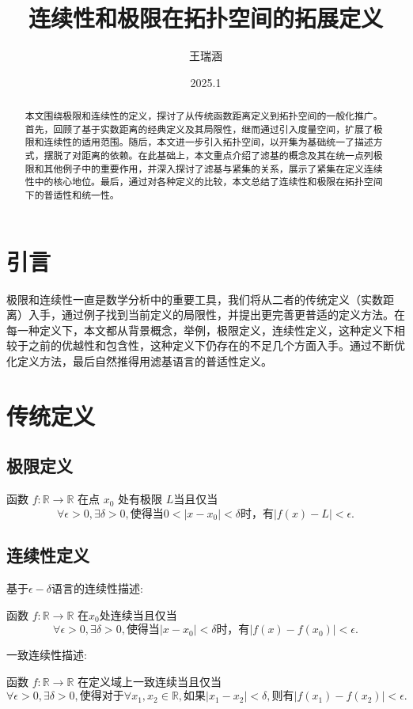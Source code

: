 \documentclass[a4paper, oneside]{article}
\title{\textbf{连续性和极限在拓扑空间的拓展定义}}
\author{王瑞涵}
\date{2025.1}
\begin{document}
\maketitle
\begin{abstract}
    本文围绕极限和连续性的定义，探讨了从传统函数距离定义到拓扑空间的一般化推广。首先，回顾了基于实数距离的经典定义及其局限性，继而通过引入度量空间，扩展了极限和连续性的适用范围。随后，本文进一步引入拓扑空间，以开集为基础统一了描述方式，摆脱了对距离的依赖。在此基础上，本文重点介绍了滤基的概念及其在统一点列极限和其他例子中的重要作用，并深入探讨了滤基与紧集的关系，展示了紧集在定义连续性中的核心地位。最后，通过对各种定义的比较，本文总结了连续性和极限在拓扑空间下的普适性和统一性。
\end{abstract}

\section{引言}
极限和连续性一直是数学分析中的重要工具，我们将从二者的传统定义（实数距离）入手，通过例子找到当前定义的局限性，并提出更完善更普适的定义方法。在每一种定义下，本文都从背景概念，举例，极限定义，连续性定义，这种定义下相较于之前的优越性和包含性，这种定义下仍存在的不足几个方面入手。通过不断优化定义方法，最后自然推得用滤基语言的普适性定义。
\section{传统定义}
\subsection{极限定义}
函数 $f: \mathbb{R} \to \mathbb{R}$ 在点 $x_0$ 处有极限 $L$当且仅当
\[
\forall \epsilon > 0, \exists \delta > 0, \text{使得当} 0 < |x - x_0| < \delta \text{时，有} |f(x) - L| < \epsilon.
\]
\subsection{连续性定义}
基于$\epsilon-\delta$语言的连续性描述:

函数 $f: \mathbb{R} \to \mathbb{R}$ 在$x_0$处连续当且仅当
\[
    \forall \epsilon > 0, \exists \delta > 0, \text{使得当} |x - x_0| < \delta \text{时，有} |f(x) - f(x_0)| < \epsilon.
\]

一致连续性描述:

函数 $f: \mathbb{R} \to \mathbb{R}$ 在定义域上一致连续当且仅当
\[
    \forall \epsilon > 0, \exists \delta > 0, \text{使得对于} \forall x_1, x_2 \in \mathbb{R}, \text{如果} |x_1 - x_2| < \delta, \text{则有} |f(x_1) - f(x_2)| < \epsilon.
\]
\end{document}
